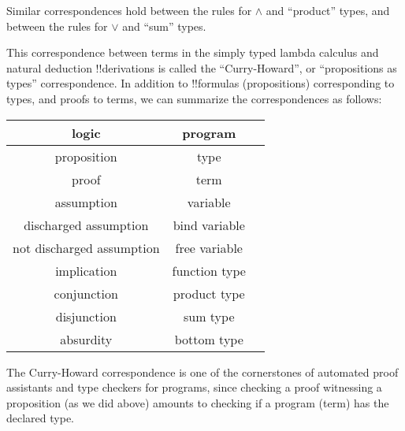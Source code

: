 \documentclass[../../../include/open-logic-section]{subfiles}
\begin{document}
Similar correspondences hold between the rules for $\land$ and ``product''
types, and between the rules for $\lor$ and ``sum'' types.

This correspondence between terms in the simply typed lambda calculus
and natural deduction !!{derivation}s is called the ``Curry-Howard'',
or ``propositions as types'' correspondence.  In addition to
!!{formula}s (propositions) corresponding to types, and proofs to
terms, we can summarize the correspondences as follows:
\begin{center}
  \begin{tabular}{c c c}
    logic & program \\
    \hline
    proposition & type \\
    proof & term \\
    assumption & variable \\
    discharged assumption & bind variable \\
    not discharged assumption & free variable \\
    implication & function type \\
    conjunction & product type \\
    disjunction & sum type \\
    absurdity & bottom type \\
    \hline
  \end{tabular}
\end{center}

The Curry-Howard correspondence is one of the cornerstones of
automated proof assistants and type checkers for programs, since
checking a proof witnessing a proposition (as we did above) amounts to
checking if a program (term) has the declared type.
\end{document}
